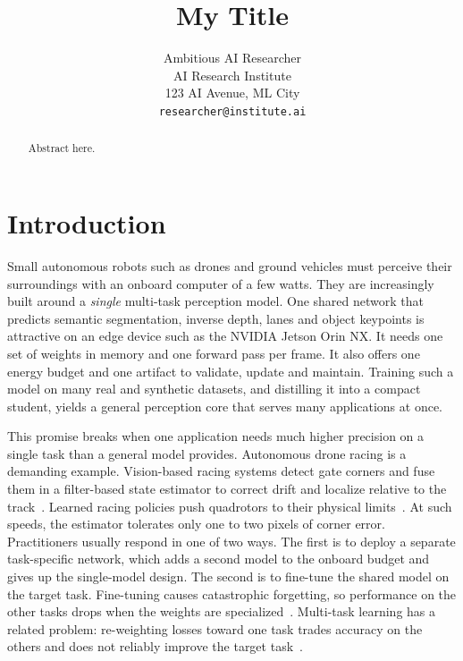 \documentclass[10pt,twocolumn,letterpaper]{article}
\title{My Title}
\author{Ambitious AI Researcher\\
AI Research Institute\\
123 AI Avenue, ML City\\
{\tt\small researcher@institute.ai}
}
\begin{document}
\maketitle

\begin{abstract}
Abstract here.
\end{abstract}

\section{Introduction}
\label{sec:intro}
Small autonomous robots such as drones and ground vehicles must perceive their surroundings with an onboard computer of a few watts. They are increasingly built around a \emph{single} multi-task perception model. One shared network that predicts semantic segmentation, inverse depth, lanes and object keypoints is attractive on an edge device such as the NVIDIA Jetson Orin NX. It needs one set of weights in memory and one forward pass per frame. It also offers one energy budget and one artifact to validate, update and maintain. Training such a model on many real and synthetic datasets, and distilling it into a compact student, yields a general perception core that serves many applications at once.

This promise breaks when one application needs much higher precision on a single task than a general model provides. Autonomous drone racing is a demanding example. Vision-based racing systems detect gate corners and fuse them in a filter-based state estimator to correct drift and localize relative to the track~\cite{Foehn2020AlphapilotAutonomous}. Learned racing policies push quadrotors to their physical limits~\cite{Song2023ReachingLimit}. At such speeds, the estimator tolerates only one to two pixels of corner error. Practitioners usually respond in one of two ways. The first is to deploy a separate task-specific network, which adds a second model to the onboard budget and gives up the single-model design. The second is to fine-tune the shared model on the target task. Fine-tuning causes catastrophic forgetting, so performance on the other tasks drops when the weights are specialized~\cite{Kirkpatrick2016OvercomingCatastrophic,Wang2023ComprehensiveSurvey}. Multi-task learning has a related problem: re-weighting losses toward one task trades accuracy on the others and does not reliably improve the target task~\cite{Xin2022DoCurrent,Lin2023DualbalancingMultitask}.
\end{document}
